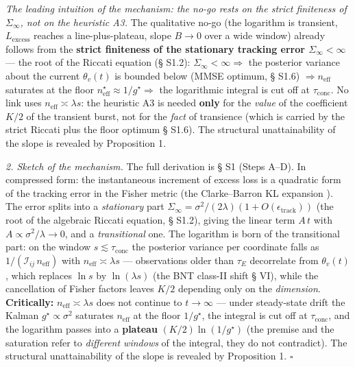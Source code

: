 \documentclass[12pt]{iopart}
\begin{document}
\emph{The leading intuition of the mechanism: the no-go rests on the strict finiteness of \(\Sigma_\infty\), not on the heuristic A3.} The qualitative no-go (the logarithm is transient, \(L_{\text{excess}}\) reaches a line-plus-plateau, slope \(B \to 0\) over a wide window) already follows from the \textbf{strict finiteness of the stationary tracking error \(\Sigma_\infty < \infty\)} --- the root of the Riccati equation (§ S1.2): \(\Sigma_\infty < \infty \Rightarrow\) the posterior variance about the current \(\theta_v(t)\) is bounded below (MMSE optimum, § S1.6) \(\Rightarrow n_{\text{eff}}\) saturates at the floor \(n_{\text{eff}}^\star \approx 1/g^\star \Rightarrow\) the logarithmic integral is cut off at \(\tau_{\text{conc}}\). No link uses \(n_{\text{eff}} \asymp \lambda s\): the heuristic A3 is needed \textbf{only} for the \emph{value} of the coefficient \(K/2\) of the transient burst, not for the \emph{fact} of transience (which is carried by the strict Riccati plus the floor optimum § S1.6). The structural unattainability of the slope is revealed by Proposition 1.



\emph{2. Sketch of the mechanism.} The full derivation is § S1 (Steps A--D). In compressed form: the instantaneous increment of excess loss is a quadratic form of the tracking error in the Fisher metric (the Clarke--Barron KL expansion \cite{ClarkeBarron1990,Rissanen1986}). The error splits into a \emph{stationary} part \(\Sigma_\infty = \sigma^2/(2\lambda)(1+O(\epsilon_{\text{track}}))\) (the root of the algebraic Riccati equation, § S1.2), giving the linear term \(A\,t\) with \(A\propto\sigma^2/\lambda\to0\), and a \emph{transitional} one. The logarithm is born of the transitional part: on the window \(s\lesssim\tau_{\text{conc}}\) the posterior variance per coordinate falls as \(1/(\mathcal I_{ij}\,n_{\text{eff}})\) with \(n_{\text{eff}}\asymp\lambda s\) --- observations older than \(\tau_E\) decorrelate from \(\theta_v(t)\), which replaces \(\ln s\) by \(\ln(\lambda s)\) (the BNT class-II shift \cite{BialekNemenmanTishby2001} § VI), while the cancellation of Fisher factors leaves \(K/2\) depending only on the \emph{dimension}. \textbf{Critically:} \(n_{\text{eff}}\asymp\lambda s\) does not continue to \(t\to\infty\) --- under steady-state drift the Kalman \(g^\star\propto\sigma^2\) saturates \(n_{\text{eff}}\) at the floor \(1/g^\star\), the integral is cut off at \(\tau_{\text{conc}}\), and the logarithm passes into a \textbf{plateau} \((K/2)\ln(1/g^\star)\) (the premise and the saturation refer to \emph{different windows} of the integral, they do not contradict). The structural unattainability of the slope is revealed by Proposition 1. \(\square\)
\end{document}

